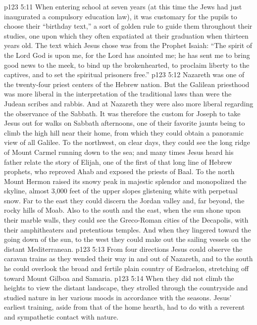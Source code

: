 \vs p123 5:11 When entering school at seven years (at this time the Jews had just inaugurated a compulsory education law), it was customary for the pupils to choose their “birthday text,” a sort of golden rule to guide them throughout their studies, one upon which they often expatiated at their graduation when thirteen years old. The text which Jesus chose was from the Prophet Isaiah: “The spirit of the Lord God is upon me, for the Lord has anointed me; he has sent me to bring good news to the meek, to bind up the brokenhearted, to proclaim liberty to the captives, and to set the spiritual prisoners free.”
\pc \vs p123 5:12 Nazareth was one of the twenty\hyp{}four priest centers of the Hebrew nation. But the Galilean priesthood was more liberal in the interpretation of the traditional laws than were the Judean scribes and rabbis. And at Nazareth they were also more liberal regarding the observance of the Sabbath. It was therefore the custom for Joseph to take Jesus out for walks on Sabbath afternoons, one of their favorite jaunts being to climb the high hill near their home, from which they could obtain a panoramic view of all Galilee. To the northwest, on clear days, they could see the long ridge of Mount Carmel running down to the sea; and many times Jesus heard his father relate the story of Elijah, one of the first of that long line of Hebrew prophets, who reproved Ahab and exposed the priests of Baal. To the north Mount Hermon raised its snowy peak in majestic splendor and monopolized the skyline, almost 3,000 feet of the upper slopes glistening white with perpetual snow. Far to the east they could discern the Jordan valley and, far beyond, the rocky hills of Moab. Also to the south and the east, when the sun shone upon their marble walls, they could see the Greco\hyp{}Roman cities of the Decapolis, with their amphitheaters and pretentious temples. And when they lingered toward the going down of the sun, to the west they could make out the sailing vessels on the distant Mediterranean.
\vs p123 5:13 From four directions Jesus could observe the caravan trains as they wended their way in and out of Nazareth, and to the south he could overlook the broad and fertile plain country of Esdraelon, stretching off toward Mount Gilboa and Samaria.
\vs p123 5:14 When they did not climb the heights to view the distant landscape, they strolled through the countryside and studied nature in her various moods in accordance with the seasons. Jesus’ earliest training, aside from that of the home hearth, had to do with a reverent and sympathetic contact with nature.
